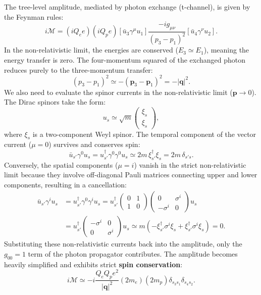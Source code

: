 The tree-level amplitude, mediated by photon exchange (t-channel), is given by the Feynman rules:
\[
    i\mathcal{M} = (iQ_e e)(iQ_p e) \left[ \bar{u}_3 \gamma^\mu u_1 \right] \frac{-ig_{\mu\nu}}{(p_3 - p_1)^2} \left[ \bar{u}_4 \gamma^\nu u_2 \right].
\]
In the non-relativistic limit, the energies are conserved ($E_3 \simeq E_1$), meaning the energy transfer is zero. The four-momentum squared of the exchanged photon reduces purely to the three-momentum transfer:
\[
    (p_3 - p_1)^2 \simeq -(\mathbf{p}_3 - \mathbf{p}_1)^2 = -|\mathbf{q}|^2.
\]
We also need to evaluate the spinor currents in the non-relativistic limit ($\mathbf{p} \to 0$). The Dirac spinors take the form:
\[
    u_s \simeq \sqrt{m} \begin{pmatrix} \xi_s \\ \xi_s \end{pmatrix},
\]
where $\xi_s$ is a two-component Weyl spinor. The temporal component of the vector current ($\mu=0$) survives and conserves spin:
\[
    \bar{u}_{s'} \gamma^0 u_s = u_{s'}^\dagger \gamma^0 \gamma^0 u_s \simeq 2m \, \xi_{s'}^\dagger \xi_s = 2m \, \delta_{s's}.
\]
Conversely, the spatial components ($\mu=i$) vanish in the strict non-relativistic limit because they involve off-diagonal Pauli matrices connecting upper and lower components, resulting in a cancellation:
\[
    \begin{aligned}
        \bar{u}_{s'} \gamma^i u_s & = u_{s'}^\dagger \gamma^0 \gamma^i u_s = u_{s'}^\dagger \begin{pmatrix} 0 & 1 \\ 1 & 0 \end{pmatrix} \begin{pmatrix} 0 & \sigma^i \\ -\sigma^i & 0 \end{pmatrix} u_s \\
                                  & = u_{s'}^\dagger \begin{pmatrix} -\sigma^i & 0 \\ 0 & \sigma^i \end{pmatrix} u_s \simeq m(-\xi_{s'}^\dagger \sigma^i \xi_s + \xi_{s'}^\dagger \sigma^i \xi_s) = 0.
    \end{aligned}
\]
Substituting these non-relativistic currents back into the amplitude, only the $g_{00} = 1$ term of the photon propagator contributes. The amplitude becomes heavily simplified and exhibits strict \textbf{spin conservation}:
\[
    i\mathcal{M} \simeq -i \frac{Q_e Q_p e^2}{|\mathbf{q}|^2} (2m_e) (2m_p) \delta_{s_3 s_1} \delta_{s_4 s_2}.
\]
